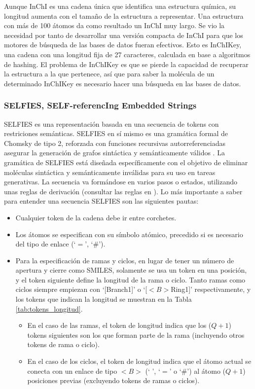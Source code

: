 Aunque InChI es una cadena única que identifica una estructura química, su longitud aumenta con el tamaño de la estructura a representar. Una estructura con más de 100 átomos da como resultado un InChI muy largo. Se vio la necesidad por tanto de desarrollar una versión compacta de InChI para que los motores de búsqueda de las bases de datos fueran efectivos. Esto es InChIKey, una cadena con una longitud fija de 27 caracteres, calculada en base a algoritmos de hashing. El problema de InChIKey es que se pierde la capacidad de recuperar la estructura a la que pertenece, así que para saber la molécula de un determinado InChIKey es necesario hacer una búsqueda en las bases de datos.

\subsubsection{SELFIES, SELF-referencIng Embedded Strings}

SELFIES es una representación basada en una secuencia de tokens con restriciones semánticas. SELFIES en sí mismo es una gramática formal de Chomsky de tipo 2, reforzada con funciones recursivas autorreferenciadas asegurar la generación de grafos sintáctica y semánticamente válidos \cite{krenn_selfies_example}. La gramática de SELFIES está diseñada específicamente con el objetivo de eliminar moléculas sintáctica y semánticamente inválidas para su uso en tareas generativas.
La secuencia va formándose en varios pasos o estados, utilizando unas reglas de derivación (consultar las reglas en \cite{selfies_derivation_rules, krenn_selfies_example}).
Lo más importante a saber para entender una secuencia SELFIES son las siguientes pautas:
\begin{itemize}
    \item Cualquier token de la cadena debe ir entre corchetes.
    \item Los átomos se especifican con su símbolo atómico, precedido si es necesario del tipo de enlace (`$=$', `\#').
    \item Para la especificación de ramas y ciclos, en lugar de tener un número de apertura y cierre como SMILES, solamente se usa un token en una posición, y el token siguiente define la longitud de la rama o ciclo. Tanto ramas como ciclos siempre empiezan con `[Branch1]' o `[$<B>$Ring1]' respectivamente, y los tokens que indican la longitud se muestran en la Tabla \ref{tab:tokens_longitud}.
    \begin{itemize}
        \item En el caso de las ramas, el token de longitud indica que los ($Q+1$) tokens siguientes son los que forman parte de la rama (incluyendo otros tokens de rama o ciclo).
        \item En el caso de los ciclos, el token de longitud indica que el átomo actual se conecta con un enlace de tipo $<B>$ (` ', `$=$' o `\#') al átomo ($Q+1$) posiciones previas (excluyendo tokens de ramas o ciclos). 
    \end{itemize}
\end{itemize}

